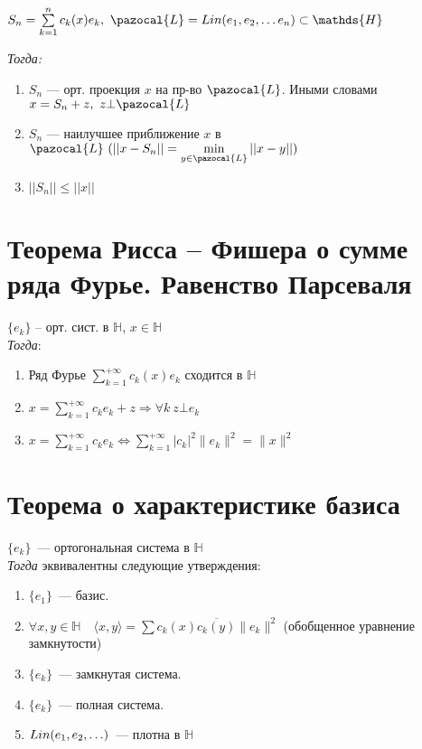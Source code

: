     $S_n = \sum\limits_{k=1}^{n} c_k(x)e_k,\ \pazocal{L} = Lin(e_1, e_2, \ldots e_n) \subset \mathds{H}$

    \emph{Тогда:}

    \begin{enumerate}

        \item $S_n$ {{---}} орт. проекция $x$ на пр-во $\pazocal{L}$. Иными словами $x = S_n + z,\ z \bot \pazocal{L}$

        \item $S_n$ {{---}} наилучшее приближение $x$ в $\pazocal{L}\ (||x - S_n|| = \min\limits_{y \in \pazocal{L}} ||x - y||)$

        \item $||S_n|| \leqslant ||x||$

    \end{enumerate}

    \section{Теорема Рисса -- Фишера о сумме ряда Фурье. Равенство Парсеваля}
    $\{e_k\}$ -- орт. сист. в $\mathds{H}$, $x \in \mathds{H}$\\

    \emph{Тогда}:
    \begin{enumerate}
        \item Ряд Фурье $\sum\limits_{k=1}^{+\infty} c_k(x) e_k$ сходится в $\mathds{H}$
        \item $x =\sum\limits_{k=1}^{+\infty} c_k e_k + z \Rightarrow \forall k \ z \bot e_k$
        \item $x =\sum\limits_{k=1}^{+\infty} c_k e_k \Leftrightarrow \sum\limits_{k=1}^{+\infty} \vert c_k \vert^2 \|e_k\|^2=\|x\|^2$
    \end{enumerate}

    \section{Теорема о характеристике базиса}

    $\{e_k\}$~--- ортогональная система в $\mathds{H}$\\

    \emph{Тогда} эквивалентны следующие утверждения:
    \begin{enumerate}
        \item $\{e_1\}$~--- базис.
        \item $\forall x, y \in \mathds{H} \quad \langle x, y \rangle = \sum c_k(x)\overline{c_k(y)}\|e_k\|^2$ (обобщенное уравнение замкнутости)
        \item $\{e_k\}$~--- замкнутая система.
        \item $\{e_k\}$~--- полная система.
        \item $Lin(e_1, e_2, \mathellipsis)$~--- плотна в $\mathds{H}$
    \end{enumerate}

